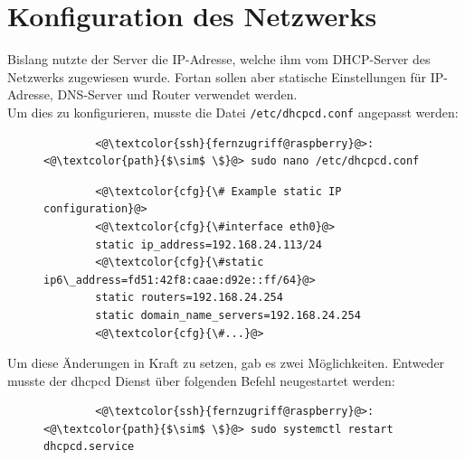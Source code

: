 \documentclass[a4paper, 12pt]{scrartcl}
\begin{document}
\section{Konfiguration des Netzwerks}\label{ch:network}
Bislang nutzte der Server die IP-Adresse, welche ihm vom DHCP-Server des Netzwerks zugewiesen wurde. Fortan sollen aber statische Einstellungen für IP-Adresse, DNS-Server und Router
verwendet werden.
\\
Um dies zu konfigurieren, musste die Datei \lstinline[basicstyle={\small\ttfamily\color{black}}]|/etc/dhcpcd.conf| angepasst
werden:
\begin{figure}[H]
    \begin{mdframed}[backgroundcolor=bbg]
        \begin{lstlisting}
        <@\textcolor{ssh}{fernzugriff@raspberry}@>:<@\textcolor{path}{$\sim$ \$}@> sudo nano /etc/dhcpcd.conf
        \end{lstlisting}
    \end{mdframed}
    \label{lst:nano_dhcpcd}
\end{figure}
\begin{figure}[H]
    \begin{mdframed}[backgroundcolor=bbg]
        \begin{lstlisting}
        <@\textcolor{cfg}{\# Example static IP configuration}@>
        <@\textcolor{cfg}{\#interface eth0}@>
        static ip_address=192.168.24.113/24
        <@\textcolor{cfg}{\#static ip6\_address=fd51:42f8:caae:d92e::ff/64}@>
        static routers=192.168.24.254
        static domain_name_servers=192.168.24.254
        <@\textcolor{cfg}{\#...}@>
        \end{lstlisting}
    \end{mdframed}
    \label{lst:static_ip}
\end{figure}
Um diese Änderungen in Kraft zu setzen, gab es zwei Möglichkeiten. Entweder musste der dhcpcd Dienst über folgenden Befehl neugestartet werden:
\begin{figure}[H]
    \begin{mdframed}[backgroundcolor=bbg]
        \begin{lstlisting}
        <@\textcolor{ssh}{fernzugriff@raspberry}@>:<@\textcolor{path}{$\sim$ \$}@> sudo systemctl restart dhcpcd.service
        \end{lstlisting}
    \end{mdframed}
    \label{lst:restart_dhcpcd}
\end{figure}
\end{document}
